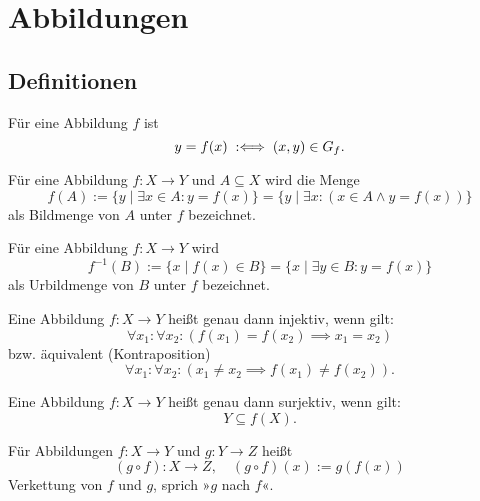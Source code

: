 \newpage
\section{Abbildungen}
\subsection{Definitionen}

\begin{Definition}[Applikation]\label{def:app}
Für eine Abbildung $f$ ist
\[y=f(x)\;:\Longleftrightarrow\; (x,y)\in G_f.\]
\end{Definition}

\begin{Definition}[Bildmenge]%
\label{def:img}\newlinefirst
Für eine Abbildung $f\colon X\to Y$ und $A\subseteq X$
wird die Menge
\[f(A) := \{y\mid \exists x\in A\colon y=f(x)\}
= \{y\mid \exists x\colon (x\in A\land y=f(x))\}\]
als Bildmenge von $A$ unter $f$ bezeichnet.
\end{Definition}

\begin{Definition}[Urbildmenge]\label{def:preimg}
Für eine Abbildung $f\colon X\to Y$ wird
\[f^{-1}(B) := \{x\mid f(x)\in B\} = \{x\mid \exists y\in B\colon y=f(x)\}\]
als Urbildmenge von $B$ unter $f$ bezeichnet.
\end{Definition}

\begin{Definition}[Injektion]%
\label{def:inj}\newlinefirst
Eine Abbildung $f\colon X\to Y$ heißt genau dann injektiv, wenn gilt:%
\[\forall x_1\colon \forall x_2\colon (f(x_1)=f(x_2)\implies x_1=x_2)\]
bzw. äquivalent (Kontraposition)
\[\forall x_1\colon \forall x_2\colon (x_1\ne x_2\implies f(x_1)\ne f(x_2)).\]
\end{Definition}

\begin{Definition}[Surjektion]%
\label{def:sur}\newlinefirst
Eine Abbildung $f\colon X\to Y$ heißt genau dann surjektiv, wenn gilt:%
\[Y\subseteq f(X).\]
\end{Definition}

\begin{Definition}[Verkettung]\label{def:composition}%
\newlinefirst
Für Abbildungen $f\colon X\to Y$ und $g\colon Y\to Z$ heißt%
\[(g\circ f)\colon X\to Z,\quad (g\circ f)(x):=g(f(x))\]
Verkettung von $f$ und $g$, sprich »$g$ nach $f$«.
\end{Definition}

